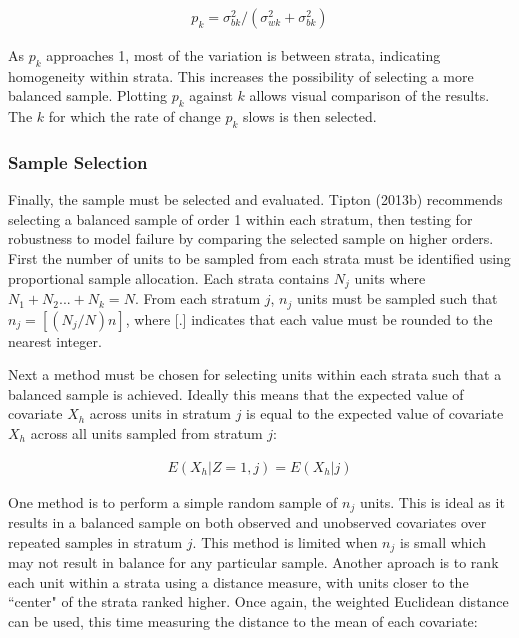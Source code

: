 \documentclass[man,floatsintext]{apa6}
\begin{document}
\begin{align} \label{eq:pk}
  p_k = \sigma_{bk}^2/(\sigma_{wk}^2 + \sigma_{bk}^2)
\end{align}

As \(p_k\) approaches 1, most of the variation is between strata, indicating homogeneity within strata. This increases the possibility of selecting a more balanced sample. Plotting \(p_k\) against \(k\) allows visual comparison of the results. The \(k\) for which the rate of change \(p_k\) slows is then selected.

\hypertarget{sample-selection}{%
\subsubsection{Sample Selection}\label{sample-selection}}

Finally, the sample must be selected and evaluated. Tipton (2013b) recommends selecting a balanced sample of order 1 within each stratum, then testing for robustness to model failure by comparing the selected sample on higher orders. First the number of units to be sampled from each strata must be identified using proportional sample allocation. Each strata contains \(N_j\) units where \(N_1 + N_2 ... + N_k = N\). From each stratum \(j\), \(n_j\) units must be sampled such that \(n_j = [(N_j/N)n]\), where {[}.{]} indicates that each value must be rounded to the nearest integer.

Next a method must be chosen for selecting units within each strata such that a balanced sample is achieved. Ideally this means that the expected value of covariate \(X_h\) across units in stratum \(j\) is equal to the expected value of covariate \(X_h\) across all units sampled from stratum \(j\):

\begin{align}
  E(X_h|Z = 1, j) = E(X_h|j)
\end{align}

One method is to perform a simple random sample of \(n_j\) units. This is ideal as it results in a balanced sample on both observed and unobserved covariates over repeated samples in stratum \(j\). This method is limited when \(n_j\) is small which may not result in balance for any particular sample. Another aproach is to rank each unit within a strata using a distance measure, with units closer to the ``center" of the strata ranked higher. Once again, the weighted Euclidean distance can be used, this time measuring the distance to the mean of each covariate:
\end{document}
